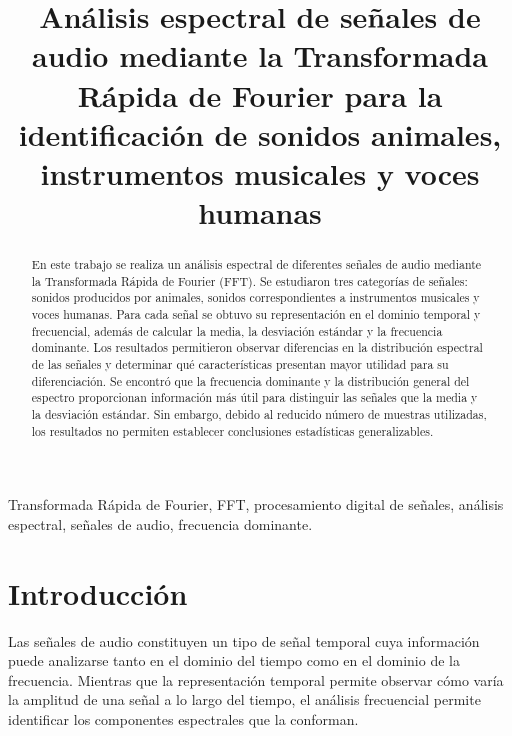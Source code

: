 \documentclass[conference]{IEEEtran}
\title{
Análisis espectral de señales de audio mediante la Transformada Rápida de Fourier para la identificación de sonidos animales, instrumentos musicales y voces humanas
}
\author{
\IEEEauthorblockN{
Yuber Garnica,
Miguel Gordillo,
Nombre Apellido
}

\IEEEauthorblockA{
Programa de Ingeniería Mecatrónica\\
Universidad Militar Nueva Granada\\
Bogotá, Colombia\\
correo@ejemplo.com
}
}
\begin{document}
\maketitle



\begin{abstract}

En este trabajo se realiza un análisis espectral de diferentes señales de audio mediante la Transformada Rápida de Fourier (FFT). Se estudiaron tres categorías de señales: sonidos producidos por animales, sonidos correspondientes a instrumentos musicales y voces humanas. Para cada señal se obtuvo su representación en el dominio temporal y frecuencial, además de calcular la media, la desviación estándar y la frecuencia dominante. Los resultados permitieron observar diferencias en la distribución espectral de las señales y determinar qué características presentan mayor utilidad para su diferenciación. Se encontró que la frecuencia dominante y la distribución general del espectro proporcionan información más útil para distinguir las señales que la media y la desviación estándar. Sin embargo, debido al reducido número de muestras utilizadas, los resultados no permiten establecer conclusiones estadísticas generalizables.

\end{abstract}



\begin{IEEEkeywords}

Transformada Rápida de Fourier, FFT, procesamiento digital de señales, análisis espectral, señales de audio, frecuencia dominante.

\end{IEEEkeywords}



\section{Introducción}

Las señales de audio constituyen un tipo de señal temporal cuya información puede analizarse tanto en el dominio del tiempo como en el dominio de la frecuencia. Mientras que la representación temporal permite observar cómo varía la amplitud de una señal a lo largo del tiempo, el análisis frecuencial permite identificar los componentes espectrales que la conforman.
\end{document}

